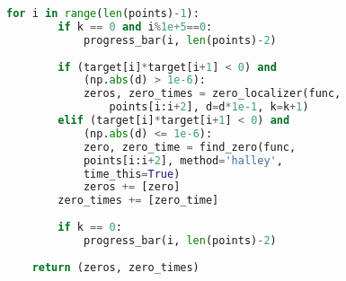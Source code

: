 \begin{lstlisting}[language=Python, showstringspaces=false, caption=Файл \texttt{math\_utils.py}.]
	for i in range(len(points)-1):
		if k == 0 and i%1e+5==0:
			progress_bar(i, len(points)-2)
		
		if (target[i]*target[i+1] < 0) and 
			(np.abs(d) > 1e-6):
			zeros, zero_times = zero_localizer(func, 
				points[i:i+2], d=d*1e-1, k=k+1)
		elif (target[i]*target[i+1] < 0) and 
			(np.abs(d) <= 1e-6):
			zero, zero_time = find_zero(func, 
			points[i:i+2], method='halley', 
			time_this=True)
			zeros += [zero]
		zero_times += [zero_time]
		
		if k == 0:
			progress_bar(i, len(points)-2)
	
	return (zeros, zero_times)
\end{lstlisting}